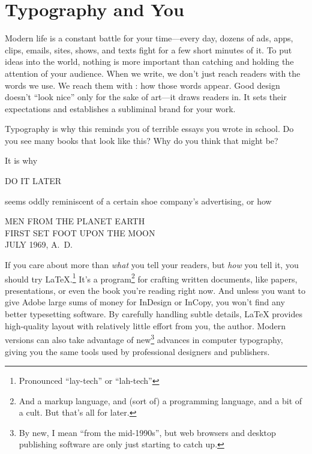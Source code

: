\chapter{Typography and You}
\label{typography}

Modern life is a constant battle for your time---every day,
dozens of ads, apps, clips, emails, sites, shows, and texts fight
for a few short minutes of it.
To put ideas into the world,
nothing is more important than catching and holding
the attention of your audience.
When we write, we don't just reach readers with the words we use.
We reach them with : how those words appear.
Good design doesn't ``look nice''
only for the sake of art---it draws readers
in.\punckern{}
It sets their expectations and establishes a subliminal brand for your
work.\punckern{}
\begin{leftfigure}
\fontsize{12pt}{24pt}\selectfont\raggedright
Typography is why this reminds you of terrible essays
you wrote in school.
Do you see many books that look like this?
Why do you think that might be?
\end{leftfigure}
\medskip

\noindent It is why
\begin{leftfigure}
\Large DO IT LATER
\end{leftfigure}
seems oddly reminiscent of a certain shoe company's advertising,
or how
\begin{center}
MEN FROM THE PLANET EARTH \\
FIRST SET FOOT UPON THE MOON \\
JULY 1969, A.~D.
\end{center}

If you care about more than \emph{what} you tell your readers, but \emph{how}
you tell it, you should try \LaTeX.\punckern\footnote{Pronounced ``lay-tech''
or ``lah-tech''}
It's a program\footnote{And a markup language,
and (sort of) a programming language, and a bit of a cult.
But that's all for later.}
for crafting written documents, like papers, presentations,
or even the book you're reading right now.
And unless you want to give Adobe large sums
of money for InDesign or InCopy,
you won't find any better typesetting software.
By carefully handling subtle details,
\LaTeX{} provides high-quality layout
with relatively little effort from you, the author.
Modern versions can also take advantage of new\footnote{By new,
I mean ``from the mid-1990s''\quotekern, but web browsers and desktop publishing
software are only just starting to catch up.} advances in computer typography,
giving you the same tools used by professional designers and publishers.

